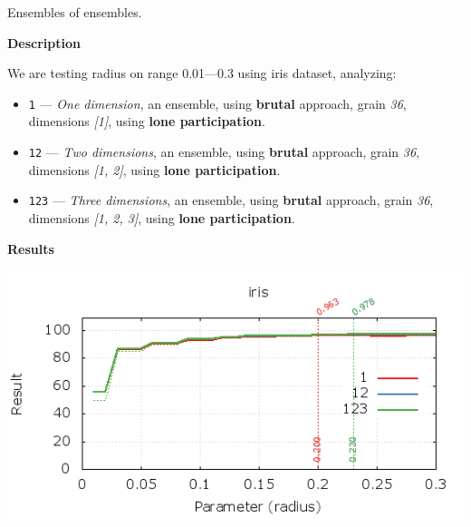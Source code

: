 \begin{experiment}{Ensembles of ensembles.}{\small \sffamily\textbf{Description}

We are testing radius on range 0.01---0.3 using iris dataset, analyzing:

\begin{itemize}
\tightlist
	\item \texttt{1} --- \emph{One dimension}, an ensemble, using \textbf{brutal} approach, grain \emph{36}, dimensions \emph{[1]}, using \textbf{lone participation}.
	\item \texttt{12} --- \emph{Two dimensions}, an ensemble, using \textbf{brutal} approach, grain \emph{36}, dimensions \emph{[1, 2]}, using \textbf{lone participation}.
	\item \texttt{123} --- \emph{Three dimensions}, an ensemble, using \textbf{brutal} approach, grain \emph{36}, dimensions \emph{[1, 2, 3]}, using \textbf{lone participation}.

\end{itemize}


\textbf{Results}

\centering
	\includegraphics[width=.75\textwidth]{plots/experiment_7_iris.png}
	\label{fig:experiment_7}
}\end{experiment}